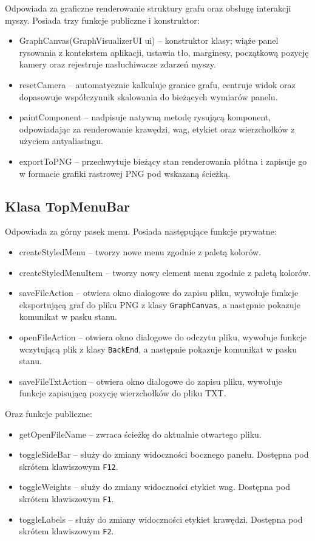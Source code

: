 \documentclass[]{article}
\begin{document}
    Odpowiada za graficzne renderowanie struktury grafu oraz obsługę interakcji myszy. Posiada trzy funkcje publiczne i konstruktor:

    \begin{itemize}
        \item GraphCanvas(GraphVisualizerUI ui) -- konstruktor klasy; wiąże panel rysowania z kontekstem aplikacji, ustawia tło, marginesy, początkową pozycję kamery oraz rejestruje nasłuchiwacze zdarzeń myszy.
        \item resetCamera -- automatycznie kalkuluje granice grafu, centruje widok oraz dopasowuje współczynnik skalowania do bieżących wymiarów panelu.
        \item paintComponent -- nadpisuje natywną metodę rysującą komponent, odpowiadając za renderowanie krawędzi, wag, etykiet oraz wierzchołków z użyciem antyaliasingu.
        \item exportToPNG -- przechwytuje bieżący stan renderowania płótna i zapisuje go w formacie grafiki rastrowej PNG pod wskazaną ścieżką.
    \end{itemize}

    \subsection{Klasa TopMenuBar}
    Odpowiada za górny pasek menu. Posiada następujące funkcje prywatne:
    \begin{itemize}
        \item createStyledMenu -- tworzy nowe menu zgodnie z paletą kolorów.
        \item createStyledMenuItem -- tworzy nowy element menu zgodnie z paletą kolorów.
        \item saveFileAction -- otwiera okno dialogowe do zapisu pliku, wywołuje funkcje eksportującą graf do pliku PNG z klasy \texttt{GraphCanvas}, a następnie pokazuje komunikat w pasku stanu.
        \item openFileAction -- otwiera okno dialogowe do odczytu pliku, wywołuje funkcje wczytującą plik z klasy \texttt{BackEnd}, a następnie pokazuje komunikat w pasku stanu.
        \item saveFileTxtAction -- otwiera okno dialogowe do zapisu pliku, wywołuje funkcje zapisującą pozycję wierzchołków do pliku TXT.
    \end{itemize}
    Oraz funkcje publiczne:
    \begin{itemize}
        \item getOpenFileName -- zwraca ścieżkę do aktualnie otwartego pliku.
        \item toggleSideBar -- służy do zmiany widoczności bocznego panelu. Dostępna pod skrótem klawiszowym \texttt{F12}.
        \item toggleWeights -- służy do zmiany widoczności etykiet wag. Dostępna pod skrótem klawiszowym \texttt{F1}.
        \item toggleLabels -- służy do zmiany widoczności etykiet krawędzi. Dostępna pod skrótem klawiszowym \texttt{F2}.
    \end{itemize}
\end{document}
